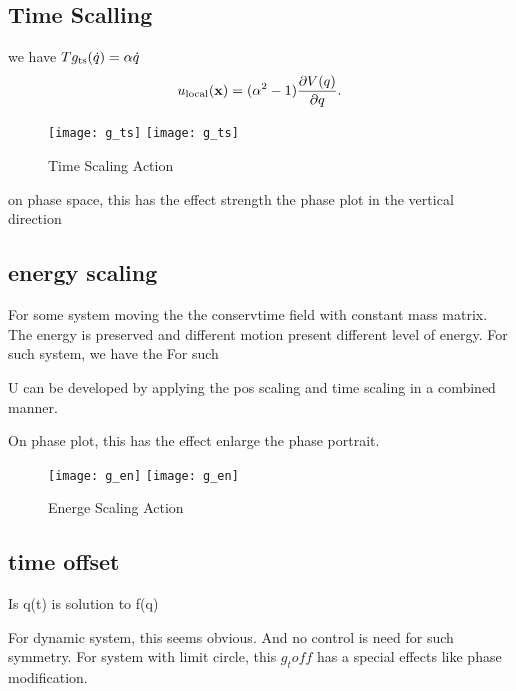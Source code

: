 \subsection*{Time Scalling}

we have
$Tg_{\mathrm{ts}}(\dot{q})=\alpha \dot{q}$
\begin{equation}
u_{\mathrm{local}}(\mathbf{x}) = (\alpha^2 - 1) \frac{\partial V(q)}{\partial q}.
\end{equation}

\begin{figure}[!htbp]
  \begin{center}
    \leavevmode
    \ifpdf
      \texttt{[image: g\_ts]}
    \else
      \texttt{[image: g\_ts]}
    \fi
    \caption{Time Scaling Action}
    \label{fig:gts}
\end{center}
\end{figure}
on phase space, this has the effect strength the phase plot in the vertical direction

\subsection*{energy scaling}
For some system moving the the conservtime field with constant mass matrix.
The energy is preserved and different motion present different level of energy.
For such system, we have the 
For such

U can be developed by applying the pos scaling and time scaling in a combined manner.

On phase plot, this has the effect enlarge the phase portrait.

\begin{figure}[!htbp]
  \begin{center}
    \leavevmode
    \ifpdf
      \texttt{[image: g\_en]}
    \else
      \texttt{[image: g\_en]}
    \fi
    \caption{Energe Scaling Action}
    \label{fig:gen}
\end{center}
\end{figure}
\subsection*{time offset}
Is q(t) is solution to f(q)

For dynamic system, this seems obvious. And no control is need for such symmetry.
For system with limit circle, this $g_toff$ has a special effects like phase modification.


